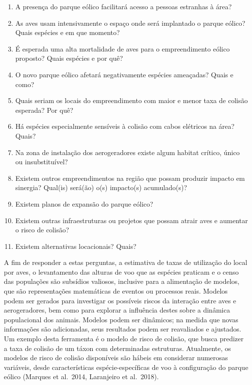 \documentclass[
  oneside]{scrbook}
\providecommand{\tightlist}{%
  \setlength{\itemsep}{0pt}\setlength{\parskip}{0pt}}
\begin{document}
\begin{enumerate}
\def\labelenumi{\arabic{enumi}.}
\tightlist
\item
  A presença do parque eólico facilitará acesso a pessoas estranhas à área?
\item
  As aves usam intensivamente o espaço onde será implantado o parque eólico? Quais espécies e em que momento?
\item
  É esperada uma alta mortalidade de aves para o empreendimento eólico proposto? Quais espécies e por quê?
\item
  O novo parque eólico afetará negativamente espécies ameaçadas? Quais e como?
\item
  Quais seriam os locais do empreendimento com maior e menor taxa de colisão esperada? Por quê?
\item
  Há espécies especialmente sensíveis à colisão com cabos elétricos na área? Quais?
\item
  Na zona de instalação dos aerogeradores existe algum habitat crítico, único ou insubstituível?
\item
  Existem outros empreendimentos na região que possam produzir impacto em sinergia? Qual(is) será(ão) o(s) impacto(s) acumulado(s)?
\item
  Existem planos de expansão do parque eólico?
\item
  Existem outras infraestruturas ou projetos que possam atrair aves e aumentar o risco de colisão?
\item
  Existem alternativas locacionais? Quais?
\end{enumerate}

A fim de responder a estas perguntas, a estimativa de taxas de utilização do local por aves, o levantamento das alturas de voo que as espécies praticam e o censo das populações são subsídios valiosos, inclusive para a alimentação de modelos, que são representações matemáticas de eventos ou processos reais. Modelos podem ser gerados para investigar os possíveis riscos da interação entre aves e aerogeradores, bem como para explorar a influência destes sobre a dinâmica populacional dos animais. Modelos podem ser dinâmicos; na medida que novas informações são adicionadas, seus resultados podem ser reavaliados e ajustados. Um exemplo desta ferramenta é o modelo de risco de colisão, que busca predizer a taxa de colisão de um táxon com determinadas estruturas. Atualmente, os modelos de risco de colisão disponíveis são hábeis em considerar numerosas variáveis, desde características espécie-específicas de voo à configuração do parque eólico (Marques et al.~2014, Laranjeiro et al.~2018).
\end{document}
